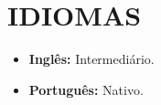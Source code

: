 \section{IDIOMAS}
\begin{itemize}
    \item \textbf{Inglês:} Intermediário.
    \item \textbf{Português:} Nativo.
\end{itemize}
